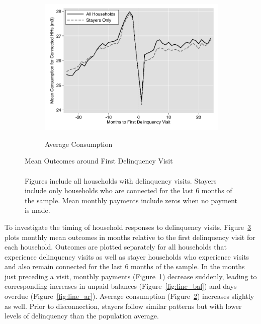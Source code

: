 \documentclass[12pt]{article}
\begin{document}
\begin{figure}[hbtp]
\begin{subfigure}[b]{0.49\textwidth}
        \label{fig:line_pay}
    \end{subfigure}
    \vskip 1mm \vskip 0pt
    \begin{subfigure}[b]{.49\textwidth}  
        \centering
        \caption[]{\small Average Consumption} 
        \vspace{-1mm}
        \includegraphics[width=\textwidth,trim={.2cm .2cm .2cm 0cm}, clip=true]{tables/line_c}  
        \label{fig:line_c}
    \end{subfigure}
    \hfill \hspace{.02\textwidth}
    \begin{minipage}{0.47\textwidth}   
    \vspace{-6cm}
    \caption[]
    {\small Mean Outcomes around First Delinquency Visit  \\  \\  Figures include all households with delinquency visits.  Stayers include only households who are connected for the last 6 months of the sample.  Mean monthly payments include zeros when no payment is made. } \label{fig:line_graphs}
    \end{minipage}
\end{figure} 


To investigate the timing of household responses to delinquency visits, Figure~\ref{fig:line_graphs} plots monthly mean outcomes in months relative to the first delinquency visit for each household.  Outcomes are plotted separately for all households that experience delinquency visits as well as stayer households who experience visits and also remain connected for the last 6 months of the sample.  In the months just preceding a visit, monthly payments (Figure~\ref{fig:line_pay}) decrease suddenly, leading to corresponding increases in unpaid balances (Figure~\ref{fig:line_bal}) and days overdue (Figure~\ref{fig:line_ar}).  Average consumption (Figure~\ref{fig:line_c}) increases slightly as well.  Prior to disconnection, stayers follow similar patterns but with lower levels of delinquency than the population average.
\end{document}
